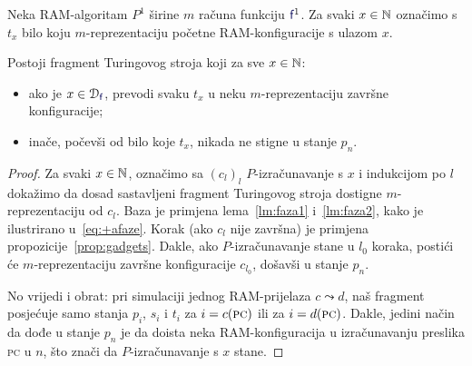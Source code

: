 \begin{propozicija}[{name=[treći fragment transpiliranog stroja]}]\label{pp:faza3}
    Neka RAM-algoritam $P^1$ širine $m$ računa funkciju $\f f^1$.
	Za svaki $x\in{\mathbb N}$ označimo s $t_x$ bilo koju $m$-reprezentaciju početne RAM-konfiguracije s ulazom $x$.

    Postoji fragment Turingovog stroja koji za sve $x\in{\mathbb N}$:
\begin{itemize}
    \item ako je $x\in\dom{\f f}$, prevodi svaku $t_x$ u neku $m$-reprezentaciju završne konfiguracije;
    \item inače, počevši od bilo koje $t_x$, nikada ne stigne u stanje $p_n$.
\end{itemize}
\end{propozicija}
\begin{proof}
	Za svaki $x\in{\mathbb N}$, označimo sa $(c_l)_l$ $P$-izračunavanje s $x$ i indukcijom po $l$ dokažimo da dosad sastavljeni fragment Turingovog stroja dostigne $m$-reprezentaciju od $c_l$. Baza je primjena lema~\ref{lm:faza1} i~\ref{lm:faza2}, kako je ilustrirano u~\eqref{eq:+afaze}. Korak (ako $c_l$ nije završna) je primjena propozicije~\ref{prop:gadgets}. Dakle, ako $P$-izračunavanje stane u $l_0$ koraka, postići će $m$-reprezentaciju završne konfiguracije $c_{l_0}$, došavši u stanje $p_n$.

No vrijedi i obrat: pri simulaciji jednog RAM-prijelaza $c\leadsto d$, naš fragment posjećuje samo stanja $p_i$, $s_i$ i $t_i$ za $i=c(\textsc{pc})$ ili za $i=d(\textsc{pc})$. Dakle, jedini način da dođe u stanje $p_n$ je da doista neka RAM-konfiguracija u izračunavanju preslika \textsc{pc} u $n$, što znači da $P$-izračunavanje s $x$ stane.
\end{proof}


